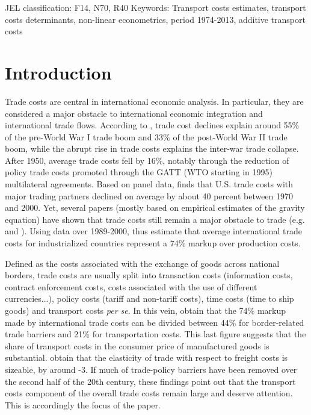 \documentclass[a4paper,11pt]{article}
\begin{document}
\thispagestyle{empty} \pagestyle{plain} \setcounter{page}{1}



{\normalsize JEL classification: F14, N70, R40\newline
Keywords: Transport costs estimates, transport costs determinants, non-linear econometrics, period 1974-2013, additive transport costs }

{\normalsize \vspace{0cm} }

{\normalsize \titlepage }

{\normalsize \newpage }


\section{Introduction}


\noindent Trade costs are central in international economic analysis. In particular, they are considered a major obstacle to international economic integration and international trade flows. According to \citet{Jacks08}, trade cost declines explain around 55\% of the pre-World War I trade boom and 33\% of the post-World War II trade boom, while the abrupt rise in trade costs explains the inter-war trade collapse. After 1950, average trade costs fell by 16\%, notably through the reduction of policy trade costs promoted through the GATT (WTO starting in 1995) multilateral agreements.
Based on panel data, \citet{novy13} finds  that U.S. trade costs with major trading partners declined on average by about 40 percent between 1970 and 2000.
Yet, several papers (mostly based on empirical estimates of the gravity equation) have shown that trade costs still remain a major obstacle to trade (e.g. \citealp{Head_Mayer04} and \citealp{Disdier_Head08}). Using data over 1989-2000, \citet{anderson_wincoop_jel} thus estimate that average international trade costs for industrialized countries represent a 74\% markup over production costs.

Defined as the costs associated with the exchange of goods across national borders, trade costs are usually split into transaction costs (information costs, contract enforcement costs, costs associated with the use of different currencies...), policy costs (tariff  and non-tariff costs), time costs (time to ship goods) and transport costs \emph{per se}. In this vein, \citet{anderson_wincoop_jel} obtain that the 74\% markup made by international trade costs can be divided between 44\% for border-related trade barriers and 21\% for transportation costs. This last figure suggests that the share of transport costs in the consumer price of manufactured goods is substantial.
\citet{Behar_Venables} obtain that the elasticity of trade with respect to freight costs is sizeable, by around -3. If much of trade-policy barriers have been removed over the second half of the 20th century, these findings point out that the transport costs component of the overall trade costs remain large and deserve attention. This is accordingly the focus of the paper.\smallskip
\end{document}
